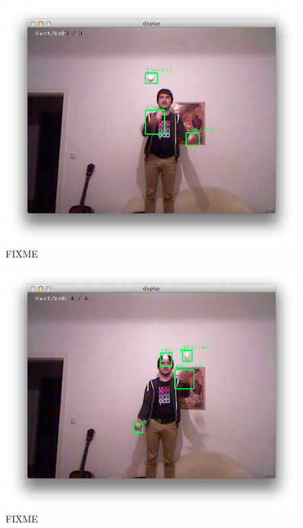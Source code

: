 \documentclass[12pt,a4paper,ngerman]{scrartcl}
\begin{document}
\begin{figure}[H]
    \centering
    \includegraphics[scale=0.5]{img/rects-1.png}
    \vspace{-0.5cm}
    \caption{FIXME}
    \label{rects-1}
\end{figure}

\begin{figure}[H]
    \centering
    \includegraphics[scale=0.5]{img/rects-2.png}
    \vspace{-0.5cm}
    \caption{FIXME}
    \label{rects-2}
\end{figure}
\end{document}
